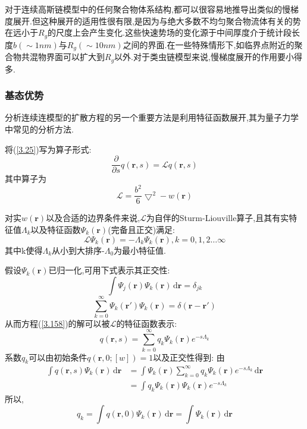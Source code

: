 对于连续高斯链模型中的任何聚合物体系结构,都可以很容易地推导出类似的慢梯度展开.但这种展开的适用性很有限,是因为与绝大多数不均匀聚合物流体有关的势在远小于$R_g$的尺度上会产生变化.这些快速势场的变化源于中间厚度介于统计段长度$b(\sim 1nm)$与$R_g(\sim 10nm)$之间的界面.在一些特殊情形下,如临界点附近的聚合物共混物界面可以扩大到$R_g$以外.对于类虫链模型来说,慢梯度展开的作用要小得多.

\subsubsection{基态优势}
分析连续连模型的扩散方程的另一个重要方法是利用特征函数展开,其为量子力学中常见的分析方法.

将(\ref{3.25})写为算子形式:
\begin{equation}
\frac{\partial}{\partial s} q(\mathbf{r},s) = \mathcal{L} q(\mathbf{r},s) \label{3.158}
\end{equation}
其中算子为
\begin{equation}
\mathcal{L} = \frac{b^2}{6}\bigtriangledown^2-w(\mathbf{r})
\end{equation}

对实$w(\mathbf{r})$以及合适的边界条件来说,$\mathcal{L}$为自伴的Sturm-Liouville算子,且其有实特征值$\Lambda_k$以及特征函数$\Psi_k (\mathbf{r})$(完备且正交)满足:
\begin{equation}
\mathcal{L} \Psi_k (\mathbf{r}) = -\Lambda_k \Psi_k (\mathbf{r}),	k=0,1,2\dots \infty \label{3.160}
\end{equation}
其中k使得$\Lambda_k$从小到大排序-$\Lambda_0$为最小特征值.

假设$\Psi_k (\mathbf{r})$已归一化,可用下式表示其正交性:
\begin{equation}
\int \Psi_j (\mathbf{r})\Psi_k (\mathbf{r})\,\mathrm{d}\mathbf{r} = \delta_{jk} \label{3.161}
\end{equation}
\begin{equation}
\sum_{k=0}^{\infty}\Psi_k (\mathbf{r}')\Psi_k (\mathbf{r}) = \delta(\mathbf{r}-\mathbf{r}')
\end{equation}
从而方程(\ref{3.158})的解可以被$\mathcal{L}$的特征函数表示:
\begin{equation}
q(\mathbf{r},s) = \sum_{k=0}^{\infty}q_k \Psi_k (\mathbf{r})e^{-s\Lambda_k} \label{3.163}
\end{equation}
系数$q_k$可以由初始条件$q(\mathbf{r},0;[w])=1$以及正交性得到:
由
$$
\begin{aligned}
\int q(\mathbf{r},s)\Psi_k (\mathbf{r})\,\mathrm{d}\mathbf{r} &= \int \Psi_k (\mathbf{r})\sum_{k=0}^{\infty}q_k \Psi_k (\mathbf{r})e^{-s\Lambda_k}\,\mathrm{d}\mathbf{r}\\
&= \int q_k \Psi_k (\mathbf{r}) \Psi_k (\mathbf{r})e^{-s\Lambda_k}
\end{aligned}
$$
所以,
\begin{equation}
q_k = \int q(\mathbf{r},0)\Psi_k (\mathbf{r})\,\mathrm{d}\mathbf{r} = \int \Psi_k (\mathbf{r})\,\mathrm{d}\mathbf{r}
\end{equation}


